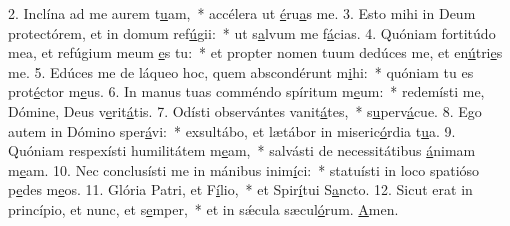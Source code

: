 2. Inclína ad me aurem t\uline{u}am,~* accélera ut \uline{é}ru\uline{a}s me.
3. Esto mihi in Deum protectórem, et in domum ref\uline{ú}gii:~* ut s\uline{a}lvum me f\uline{á}cias.
4. Quóniam fortitúdo mea, et refúgium meum \uline{e}s tu:~* et propter nomen tuum dedúces me, et en\uline{ú}tri\uline{e}s me.
5. Edúces me de láqueo hoc, quem abscondérunt m\uline{i}hi:~* quóniam tu es prot\uline{é}ctor m\uline{e}us.
6. In manus tuas comméndo spíritum m\uline{e}um:~* redemísti me, Dómine, Deus v\uline{e}rit\uline{á}tis.
7. Odísti observántes vanit\uline{á}tes,~* s\uline{u}perv\uline{á}cue.
8. Ego autem in Dómino sper\uline{á}vi:~* exsultábo, et lætábor in miseric\uline{ó}rdia t\uline{u}a.
9. Quóniam respexísti humilitátem m\uline{e}am,~* salvásti de necessitátibus \uline{á}nimam m\uline{e}am.
10. Nec conclusísti me in mánibus inim\uline{í}ci:~* statuísti in loco spatióso p\uline{e}des m\uline{e}os.
11. Glória Patri, et F\uline{í}lio,~* et Spir\uline{í}tui S\uline{a}ncto.
12. Sicut erat in princípio, et nunc, et s\uline{e}mper,~* et in sǽcula sæcul\uline{ó}rum. \uline{A}men.
